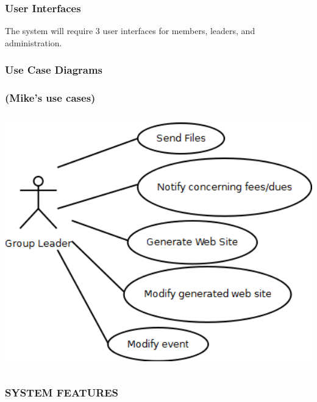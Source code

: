 \documentclass[letterpaper]{article}
\begin{document}
\subsubsection[User Interfaces]{\rmfamily User Interfaces}
{\color{black}
The system will require 3 user interfaces for members, leaders, and
administration.}


\bigskip

\subsubsection[Use Case Diagrams]{\rmfamily Use Case Diagrams}
\subsubsection[(Mike{\textquoteright}s use cases)]{\rmfamily
(Mike{\textquoteright}s use cases)}
 \includegraphics[width=5.5811in,height=4.3484in]{Gusspec-img2.png} 


\bigskip

\subsubsection[SYSTEM FEATURES]{\rmfamily SYSTEM FEATURES}
\end{document}
